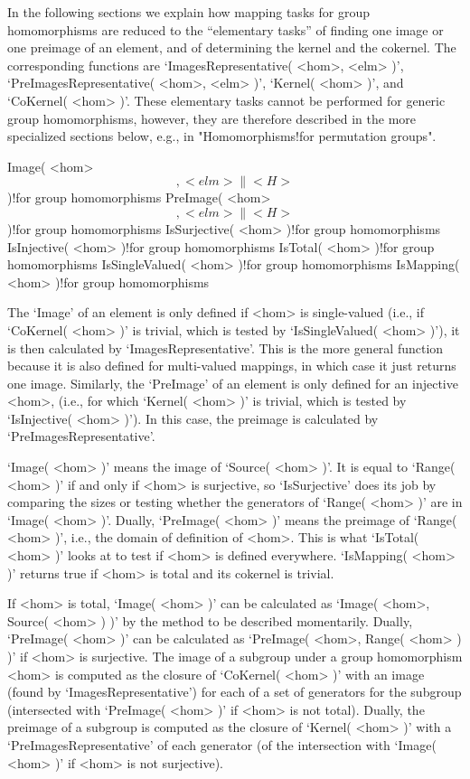 In  the  following  sections  we explain   how  mapping  tasks  for group
homomorphisms are  reduced  to the ``elementary  tasks''  of  finding one
image or one preimage  of an element,  and of determining the kernel  and
the  cokernel. The   corresponding functions  are  `ImagesRepresentative(
<hom>,   <elm> )',  `PreImagesRepresentative(  <hom>,  <elm> )', `Kernel(
<hom> )', and  `CoKernel( <hom>  )'.   These elementary tasks  cannot  be
performed  for generic  group homomorphisms, however,  they are therefore
described   in     the more  specialized      sections  below,  e.g.,  in
"Homomorphisms!for permutation groups".

\>Image( <hom> \[, <elm> \| <H> \] )!{for group homomorphisms}
\>PreImage( <hom> \[, <elm> \| <H> \] )!{for group homomorphisms}
\>IsSurjective( <hom> )!{for group homomorphisms}
\>IsInjective( <hom> )!{for group homomorphisms}
\>IsTotal( <hom> )!{for group homomorphisms}
\>IsSingleValued( <hom> )!{for group homomorphisms}
\>IsMapping( <hom> )!{for group homomorphisms}

The `Image' of  an  element  is only defined  if  <hom>  is single-valued
(i.e.,      if `CoKernel(  <hom>  )' is     trivial,  which is  tested by
`IsSingleValued(     <hom>    )'),   it     is  then      calculated   by
`ImagesRepresentative'. This is the  more general function because it  is
also defined for multi-valued mappings, in which case it just returns one
image. Similarly,  the `PreImage' of  an element is  only defined  for an
injective <hom>, (i.e., for which `Kernel( <hom> )'  is trivial, which is
tested  by  `IsInjective( <hom>   )').  In  this  case, the   preimage is
calculated by `PreImagesRepresentative'.

`Image(  <hom> )' means the image  of `Source( <hom>  )'.  It is equal to
`Range(  <hom> )' if  and only if <hom>  is surjective, so `IsSurjective'
does its job by comparing the sizes or  testing whether the generators of
`Range( <hom>  )' are in  `Image( <hom> )'.  Dually,  `PreImage( <hom> )'
means the preimage of `Range( <hom> )', i.e., the domain of definition of
<hom>. This  is what  `IsTotal(  <hom> )'  looks at  to  test if <hom> is
defined everywhere. `IsMapping( <hom>  )' returns true  if <hom> is total
and its cokernel is trivial.

If <hom> is  total, `Image( <hom> )' can  be calculated as `Image( <hom>,
Source( <hom> )  )' by the  method to  be  described momentarily. Dually,
`PreImage( <hom> )' can be calculated as `PreImage( <hom>, Range( <hom> )
)' if  <hom>  is  surjective.  The image   of  a subgroup under  a  group
homomorphism <hom> is computed as the closure of `CoKernel( <hom> )' with
an   image (found by  `ImagesRepresentative')    for each  of  a set   of
generators  for the  subgroup (intersected with   `PreImage(  <hom> )' if
<hom> is  not total). Dually, the preimage  of a subgroup  is computed as
the closure of `Kernel( <hom> )' with a `PreImagesRepresentative' of each
generator (of  the  intersection with `Image(   <hom> )' if  <hom> is not
surjective).

